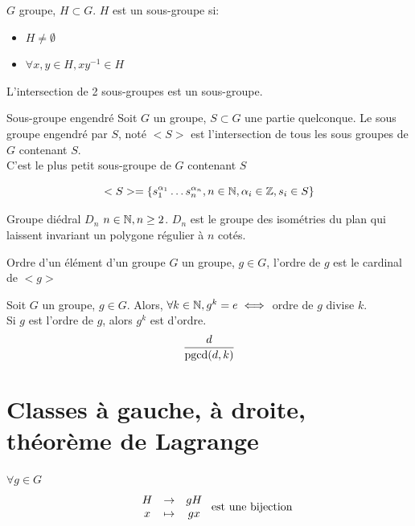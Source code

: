 \documentclass[]{report}
\begin{document}
\begin{prop}{}{}
    $G$ groupe, $H\subset G$. $H$ est un sous-groupe si:
    \begin{itemize}
        \item $H\neq \emptyset$
        \item $\forall x,y \in H,x y^{-1}\in H$
    \end{itemize}
\end{prop}

\begin{prop}{}{}
    L'intersection de 2 sous-groupes est un sous-groupe.
\end{prop}

\begin{df}{Sous-groupe engendré}{}
    Soit $G$ un groupe, $S\subset G$ une partie quelconque. Le sous groupe engendré par $S$, noté $<S>$ est l'intersection de tous les sous groupes de $G$ contenant $S$.\\
    C'est le plus petit sous-groupe de $G$ contenant $S$
\end{df}

\begin{prop}{}{}
    \[<S>=\{ s_1^{\alpha_1}\ldots s_n^{\alpha_n},n\in \mathbb{N},\alpha_i \in \mathbb{Z},s_i\in S\}\]
\end{prop}

\begin{ex}{Groupe diédral $D_n$}{}
    $n\in \mathbb{N},n\ge 2$. $D_n$ est le groupe des isométries du plan qui laissent invariant un polygone régulier à $n$ cotés.
\end{ex}

\begin{df}{Ordre d'un élément d'un groupe}{}
    $G$ un groupe, $g\in G$, l'ordre de $g$ est le cardinal de $<g>$
\end{df}

\begin{prop}{}{}
    Soit $G$ un groupe, $g\in G$. Alors, $\forall k\in \mathbb{N}, g^k=e\iff $ ordre de $g$ divise $k$.\\
    Si $g$ est l'ordre de $g$, alors $g^k$ est d'ordre.
    \[\frac{d}{\text{pgcd}(d,k)}\]
\end{prop}

\section{Classes à gauche, à droite, théorème de Lagrange}

\begin{prop}{}{}
    $\forall g\in G$
    \[\begin{array}{ccccc} & H & \to & gH \\ & x & \mapsto & gx \end{array}\text{ est une bijection}\]
\end{prop}
\end{document}
